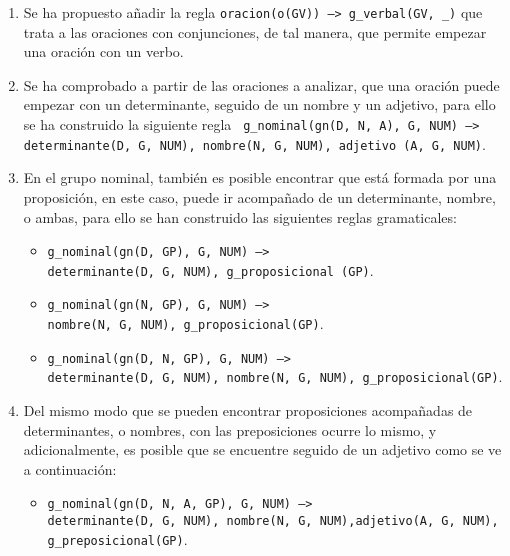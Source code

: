 \documentclass[a4paper]{article}
\begin{document}
    \begin{enumerate}

        \item Se ha propuesto añadir la regla  \texttt{oracion(o(GV)) --> g\_verbal(GV, \_)} que trata a las oraciones con conjunciones, de tal manera, que permite empezar una oración con un verbo.

        \item Se ha comprobado a partir de las oraciones a analizar, que una oración puede empezar con un determinante, seguido de un nombre y un adjetivo, para ello se ha construido la siguiente regla \texttt{ g\_nominal(gn(D, N, A), G, NUM) --> determinante(D, G, NUM), nombre(N, G, NUM), adjetivo (A, G, NUM)}.

        \item En el grupo nominal, también es posible encontrar que está formada por una proposición, en este caso, puede ir acompañado de un determinante, nombre, o ambas, para ello se han construido las siguientes reglas gramaticales:

            \begin{itemize}

                \item \texttt{g\_nominal(gn(D, GP), G, NUM) -->\\ determinante(D, G, NUM), g\_proposicional (GP)}.

                \item \texttt{g\_nominal(gn(N, GP), G, NUM) -->\\ nombre(N, G, NUM), g\_proposicional(GP)}.

                \item \texttt{g\_nominal(gn(D, N, GP), G, NUM) -->\\ determinante(D, G, NUM), nombre(N, G, NUM), g\_proposicional(GP)}.

            \end{itemize}

        \item Del mismo modo que se pueden encontrar proposiciones acompañadas de determinantes, o nombres, con las preposiciones ocurre lo mismo, y adicionalmente, es posible  que se encuentre seguido de un adjetivo como se ve a continuación:

            \begin{itemize}

                \item \texttt{g\_nominal(gn(D, N, A, GP), G, NUM) -->\\ determinante(D, G, NUM), nombre(N, G, NUM),adjetivo(A, G, NUM), g\_preposicional(GP)}.


\end{itemize}
\end{enumerate}
\end{document}
